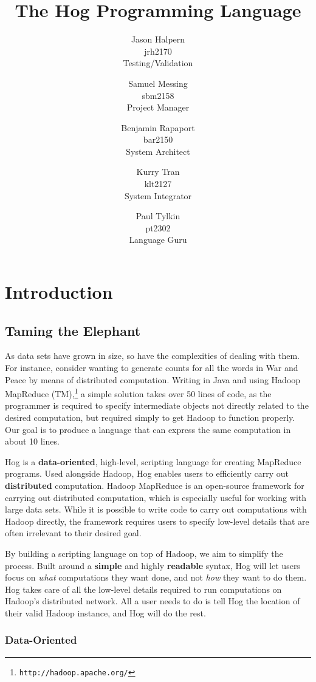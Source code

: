 \documentclass{report}
\title{\huge \textbf{The Hog Programming Language}}
\author{Jason Halpern \\ jrh2170 \\ Testing/Validation
        \and Samuel Messing \\ sbm2158 \\ Project Manager
        \and Benjamin Rapaport \\ bar2150 \\ System Architect
        \and Kurry Tran \\ klt2127 \\ System Integrator
        \and Paul Tylkin \\ pt2302 \\ Language Guru}
\begin{document}
\maketitle

\tableofcontents

\chapter{Introduction}
\label{chap:intro}

\section{Taming the Elephant}
\label{sec:elephant}

As data sets have grown in size, so have the complexities of dealing with them.
For instance, consider wanting to generate counts for all the words in War and
Peace by means of distributed computation. Writing in Java and using Hadoop
MapReduce (TM),\footnote{\texttt{http://hadoop.apache.org/}} a simple solution
takes over 50 lines of code, as the programmer is required to specify
intermediate objects not directly related to the desired computation, but
required simply to get Hadoop to function properly. Our goal is to produce a
language that can express the same computation in about 10 lines.

Hog is a \textbf{data-oriented}, high-level, scripting language for creating
MapReduce\cite{dean:2004} programs. Used alongside Hadoop, Hog enables users to
efficiently carry out \textbf{distributed} computation. Hadoop MapReduce is an
open-source framework for carrying out distributed computation, which is
especially useful for working with large data sets. While it is possible to
write code to carry out computations with Hadoop directly, the framework
requires users to specify low-level details that are often irrelevant to their
desired goal. 


By building a scripting language on top of Hadoop, we aim to simplify the
process. Built around a \textbf{simple} and highly \textbf{readable} syntax,
Hog will let users focus on \emph{what} computations they want done, and not
\emph{how} they want to do them.  Hog takes care of all the low-level details
required to run computations on Hadoop’s distributed network. All a user needs
to do is tell Hog the location of their valid Hadoop instance, and Hog will do
the rest.

\subsection{Data-Oriented}
\label{sub:data-oriented}
\end{document}
